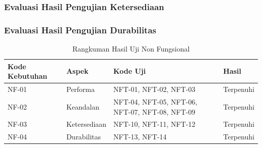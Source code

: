 \subsubsection{Evaluasi Hasil Pengujian Ketersediaan}

\subsubsection{Evaluasi Hasil Pengujian Durabilitas}

\begin{longtable}{|p{1.5cm}|p{2cm}|p{3cm}|p{1.5cm}|}
	\caption{Rangkuman Hasil Uji Non Fungsional} \label{t:eval_nf} \\ \hline
	\rowcolor{lightgray} Kode Kebutuhan & Aspek & Kode Uji & Hasil \\ \hline
	NF-01 & Performa & NFT-01, NFT-02, NFT-03 & Terpenuhi \\ \hline
	NF-02 & Keandalan & NFT-04, NFT-05, NFT-06, NFT-07, NFT-08, NFT-09 & Terpenuhi \\ \hline
	NF-03 & Ketersediaan & NFT-10, NFT-11, NFT-12 & Terpenuhi \\ \hline
	NF-04 & Durabilitas & NFT-13, NFT-14 & Terpenuhi \\ \hline
\end{longtable}
